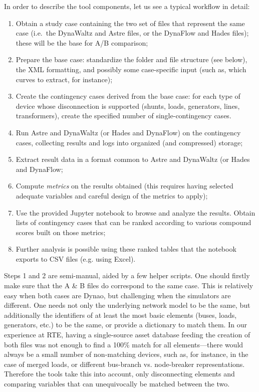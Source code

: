 \documentclass[conference]{IEEEtran}
\newcommand{\Dynawo}{Dyna\textomega o\xspace} %
\begin{document}
In order to describe the tool components, let us see a typical workflow in
detail:
\begin{enumerate}
  \item Obtain a study case containing the two set of files that represent the
        same case (i.e.~the DynaWaltz and Astre files, or the DynaFlow and Hades
        files); these will be the base for A/B comparison;
  \item Prepare the base case: standardize the folder and file structure (see
        below), the XML formatting, and possibly some case-specific input (such as,
        which curves to extract, for instance);
  \item Create the contingency cases derived from the base case: for each type
        of device whose disconnection is supported (shunts, loads, generators,
        lines, transformers), create the specified number of single-contingency
        cases.
  \item Run Astre and DynaWaltz (or Hades and DynaFlow) on the contingency
        cases, collecting results and logs into organized (and compressed)
        storage;
  \item Extract result data in a format common to Astre and DynaWaltz (or Hades
        and DynaFlow;
  \item Compute \emph{metrics} on the results obtained (this requires having
        selected adequate variables and careful design of the metrics to apply);
  \item Use the provided Jupyter notebook to browse and analyze the results.
        Obtain lists of contingency cases that can be ranked according to various
        compound scores built on those metrics;
  \item Further analysis is possible using these ranked tables that
        the notebook exports to CSV files (e.g. using Excel).
\end{enumerate}

Steps 1 and 2 are semi-manual, aided by a few helper scripts.  One should
firstly make sure that the A \& B files do correspond to the same case. This is
relatively easy when both cases are \Dynawo, but challenging when the simulators
are different.  One needs not only the underlying network model to be the same,
but additionally the identifiers of at least the most basic elements (buses,
loads, generators, etc.) to be the same, or provide a dictionary to match them.
In our experience at RTE, having a single-source asset database feeding the
creation of both files was not enough to find a 100\% match for all
elements---there would always be a small number of non-matching devices, such
as, for instance, in the case of merged loads, or different bus-branch
vs. node-breaker representations. Therefore the tools take this into account,
only disconnecting elements and comparing variables that can unequivocally be
matched between the two.
\end{document}
